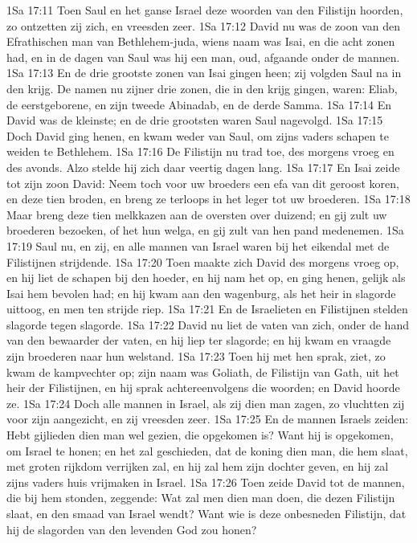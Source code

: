 1Sa 17:11  Toen Saul en het ganse Israel deze woorden van den Filistijn hoorden, zo ontzetten zij zich, en vreesden zeer.
1Sa 17:12  David nu was de zoon van den Efrathischen man van Bethlehem-juda, wiens naam was Isai, en die acht zonen had, en in de dagen van Saul was hij een man, oud, afgaande onder de mannen.
1Sa 17:13  En de drie grootste zonen van Isai gingen heen; zij volgden Saul na in den krijg. De namen nu zijner drie zonen, die in den krijg gingen, waren: Eliab, de eerstgeborene, en zijn tweede Abinadab, en de derde Samma.
1Sa 17:14  En David was de kleinste; en de drie grootsten waren Saul nagevolgd.
1Sa 17:15  Doch David ging henen, en kwam weder van Saul, om zijns vaders schapen te weiden te Bethlehem.
1Sa 17:16  De Filistijn nu trad toe, des morgens vroeg en des avonds. Alzo stelde hij zich daar veertig dagen lang.
1Sa 17:17  En Isai zeide tot zijn zoon David: Neem toch voor uw broeders een efa van dit geroost koren, en deze tien broden, en breng ze terloops in het leger tot uw broederen.
1Sa 17:18  Maar breng deze tien melkkazen aan de oversten over duizend; en gij zult uw broederen bezoeken, of het hun welga, en gij zult van hen pand medenemen.
1Sa 17:19  Saul nu, en zij, en alle mannen van Israel waren bij het eikendal met de Filistijnen strijdende.
1Sa 17:20  Toen maakte zich David des morgens vroeg op, en hij liet de schapen bij den hoeder, en hij nam het op, en ging henen, gelijk als Isai hem bevolen had; en hij kwam aan den wagenburg, als het heir in slagorde uittoog, en men ten strijde riep.
1Sa 17:21  En de Israelieten en Filistijnen stelden slagorde tegen slagorde.
1Sa 17:22  David nu liet de vaten van zich, onder de hand van den bewaarder der vaten, en hij liep ter slagorde; en hij kwam en vraagde zijn broederen naar hun welstand.
1Sa 17:23  Toen hij met hen sprak, ziet, zo kwam de kampvechter op; zijn naam was Goliath, de Filistijn van Gath, uit het heir der Filistijnen, en hij sprak achtereenvolgens die woorden; en David hoorde ze.
1Sa 17:24  Doch alle mannen in Israel, als zij dien man zagen, zo vluchtten zij voor zijn aangezicht, en zij vreesden zeer.
1Sa 17:25  En de mannen Israels zeiden: Hebt gijlieden dien man wel gezien, die opgekomen is? Want hij is opgekomen, om Israel te honen; en het zal geschieden, dat de koning dien man, die hem slaat, met groten rijkdom verrijken zal, en hij zal hem zijn dochter geven, en hij zal zijns vaders huis vrijmaken in Israel.
1Sa 17:26  Toen zeide David tot de mannen, die bij hem stonden, zeggende: Wat zal men dien man doen, die dezen Filistijn slaat, en den smaad van Israel wendt? Want wie is deze onbesneden Filistijn, dat hij de slagorden van den levenden God zou honen?
